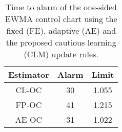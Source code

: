 \begin{table}[H]

\caption{\label{tab:ICU OC alarm}Time to alarm of the one-sided EWMA control chart using the fixed (FE), adaptive (AE) and the proposed cautious learning (CLM) update rules.}
\centering
\begin{tabular}[t]{ccc}
\toprule
Estimator & Alarm & Limit\\
\midrule
CL-OC & 30 & 1.055\\
FP-OC & 41 & 1.215\\
AE-OC & 31 & 1.022\\
\bottomrule
\end{tabular}
\end{table}
